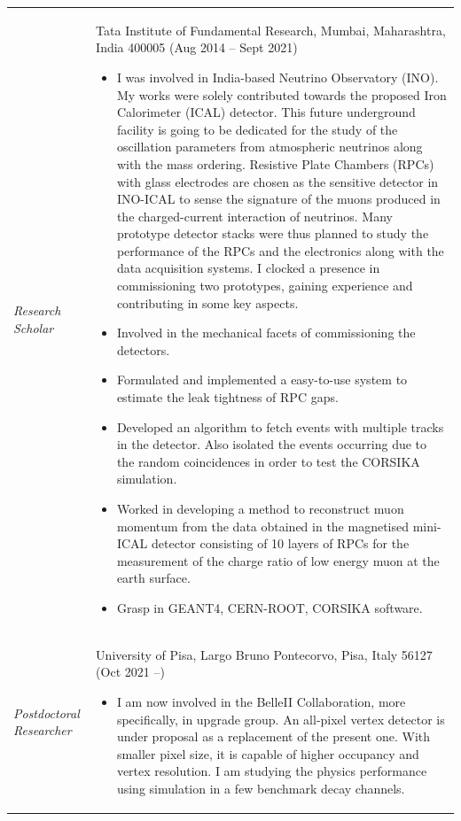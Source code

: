 \documentclass[12pt]{article}
\begin{document}
\begin{minipage}{1.05\textwidth}
\vspace{0.4cm}
\begin{tabular}{p{3cm} p{14cm} }
  {\emph{Research Scholar}} & Tata Institute of Fundamental Research, Mumbai, Maharashtra, India 400005 (Aug 2014 -- Sept 2021)

  \begin{itemize}
  \item I was involved in India-based Neutrino
    Observatory (INO). My works were solely contributed towards
    the proposed Iron Calorimeter (ICAL) detector. This future
    underground facility is going to be dedicated for the study of the
    oscillation parameters from atmospheric neutrinos along with
    the mass ordering. Resistive Plate Chambers (RPCs) with glass
    electrodes are chosen as the sensitive detector in INO-ICAL to
    sense the signature of the muons produced in the charged-current
    interaction of neutrinos. Many prototype detector stacks were thus
    planned to study the performance of the RPCs and the electronics
    along with the data acquisition systems. I clocked a presence
    in commissioning two prototypes, gaining experience and contributing
    in some key aspects.
  \item Involved in the mechanical facets of commissioning the detectors.
  \item Formulated and implemented a easy-to-use system to estimate the
    leak tightness of RPC gaps.
  \item Developed an algorithm to fetch events with multiple tracks
    in the detector. Also isolated the events occurring due to the
    random coincidences in order to test the CORSIKA simulation.
  \item Worked in developing a method to reconstruct muon momentum
    from the data obtained in the magnetised mini-ICAL detector
    consisting of 10 layers of RPCs for the measurement of the charge
    ratio of low energy muon at the earth surface.
  \item Grasp in GEANT4, CERN-ROOT, CORSIKA software.
  \end{itemize}
  \\
  
  {\emph{Postdoctoral Researcher}} & University of Pisa, Largo Bruno Pontecorvo, Pisa, Italy 56127 (Oct 2021 --)
  
  \begin{itemize}
  \item\mbox{} I am now involved in the BelleII Collaboration, more
    specifically, in upgrade group.
    An all-pixel vertex detector is under proposal as a replacement of
    the present one. With smaller pixel size, it is capable of higher
    occupancy and vertex resolution.
    I am studying the physics performance using simulation in a
    few benchmark decay channels. 
  \end{itemize}
  
\end{tabular}
\end{minipage}
\end{document}
